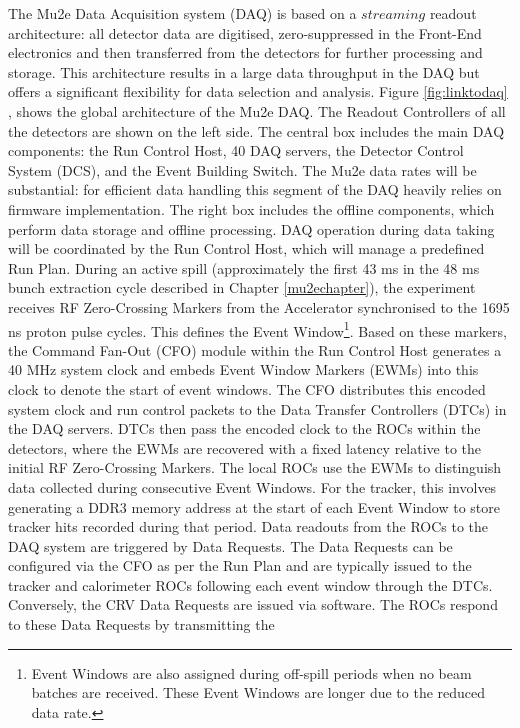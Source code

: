 The Mu2e Data Acquisition system (DAQ) is based on a $streaming$ readout architecture: 
all detector data are digitised, zero-suppressed in the 
Front-End electronics 
and then transferred from the detectors for further 
processing and storage. 
This architecture results in a large data throughput in 
the DAQ but offers a 
significant flexibility for data selection and analysis. 
Figure \ref{fig:linktodaq} \cite{GIOIOSA2023167732}, 
shows the global 
architecture of the Mu2e DAQ. 
The Readout Controllers of all the detectors are shown 
on the left side. The central box includes the main DAQ 
components: the Run Control Host, 40 DAQ servers, the 
Detector Control System (DCS), and the Event Building 
Switch. The Mu2e data rates will be substantial: for 
efficient data handling this segment of the DAQ heavily 
relies on firmware implementation. The right box includes 
the offline components, which perform data storage and 
offline processing. DAQ operation during data taking will be coordinated by the Run Control Host, 
which will manage a predefined Run Plan. During an active spill (approximately the first 
43 ms in the 48 ms bunch extraction cycle described in Chapter \ref{mu2echapter}), 
the experiment receives RF Zero-Crossing Markers from the Accelerator 
synchronised to the 1695 ns proton pulse cycles. This defines the 
Event Window\footnote{Event Windows are also assigned during off-spill periods 
when no beam batches are received. 
These Event Windows are longer due to the reduced data rate.}. 
Based on these markers, the Command Fan-Out (CFO) module within the 
Run Control Host generates a 40 MHz system clock and embeds Event 
Window Markers (EWMs) into this clock to denote the start of event 
windows. The CFO distributes this encoded system clock and run control 
packets to the Data Transfer Controllers (DTCs) in the DAQ servers. 
DTCs then pass the encoded clock to the ROCs within the detectors, 
where the EWMs are recovered with a fixed latency relative to the 
initial RF Zero-Crossing Markers. The local ROCs use the EWMs to distinguish 
data collected during consecutive Event Windows. For the tracker, 
this involves generating a DDR3 memory address at the start of each 
Event Window to store tracker hits recorded during that period. 
Data readouts from the ROCs to the DAQ system are triggered by Data Requests. 
The Data Requests can be configured via the CFO as per the Run Plan and are 
typically issued to the tracker and calorimeter ROCs following each event 
window through the DTCs. Conversely, the CRV Data Requests are issued via 
software. The ROCs respond to these Data Requests by transmitting the 
